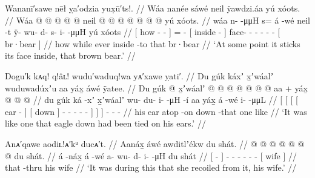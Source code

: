 \ex\label{ex:91-108-stick-face-inside}%
%
\begingl
	\glpreamble	Wananī′sawe nēł ỵa′odzia yux̣ū′ts!. //
	\glpreamble	Wáa nanée sáwé neil ÿawdzi.áa yú xóots. //
	\gla	{} Wáa  @ {} @ {} @ {} {}
		 @ {} @ {}
		{} neil @ {} {}  @ {} @ {} @ {} @ {} @ {} @ {}
		{} yú xóots. {} //
	\glb	{} wáa n-  -μμH {} {} s= á -wé
		{} neil -t {} ÿ- wu- d- s- i-  -μμH
		{} yú xóots {} //
	\glc	{}[ how -  - \· {}]
		=  -
		{}[ inside - {}] face- - - - -  -
		{}[  br·bear {}] //
	\gld	{} how  {} {} \·while {}
		ever\•  {}
		{} inside -to {}  {} {} {} {} {} {}
		{} that br·bear {} //
	\glft	‘At some point it sticks its face inside, that brown bear.’
		//
\endgl
\xe

\ex\label{ex:91-109-like-down-tied-on-ear}%
%
\begingl
	\glpreamble	Dogu′k kᴀq! q!âʟ! wudu′waduq!wa yᴀ′xawe ỵati′. //
	\glpreamble	Du gúk káxʼ x̱ʼwáalʼ wuduwadúxʼu aa yáx̱ áwé ÿatee. //
	\gla	{} {} {} {} Du gúk  @ {} {}
			{} x̱ʼwáalʼ @ {}
			 @ {} @ {} @ {} @ {} @ {} @ {}
			aa {} + 
			yáx̱ {}  @ {}
		 @ {} @ {} //
	\glb	{} {} {} {} du gúk ká -xʼ {}
			{} x̱ʼwáalʼ {}
			wu- du- i-  -μH -í {}
			aa {} yáx̱ {} á -wé
		i-  -μμL //
	\glc	{}[ {}[ {}[ {}[  ear  - {}]
			{}[ down {}]
			- - -  - - {}]
			 {}]  {}]  -
		-  - //
	\gld	{} {} {} {} his ear atop -on {}
			{} down {}
			 {} {} {} {} -that {}
			one {} like {}  {}
		 {} {} //
	\glft	‘It was like one that eagle down had been tied on his ears.’
		//
\endgl
\xe

\ex\label{ex:91-110-wife-recoiled-from}%
%
\begingl
	\glpreamble	Anᴀ′qawe aodiʟ!ᴀ′kᵘ ducᴀ′t. //
	\glpreamble	Aanáx̱ áwé awditlʼékw du shát. //
	\gla	{}  @ {} {}  @ {}
		 @ {} @ {} @ {} @ {} @ {}
		{} du shát. {} //
	\glb	{} á -náx̱ {} á -wé
		a- wu- d- i-  -μH
		{} du shát {} //
	\glc	{}[  - {}]  -
		- - - -  -
		{}[  wife {}] //
	\gld	{} that -thru {}  {}
		 {} {} {} {} {}
		{} his wife {} //
	\glft	‘It was during this that she recoiled from it, his wife.’
		//
\endgl
\xe

